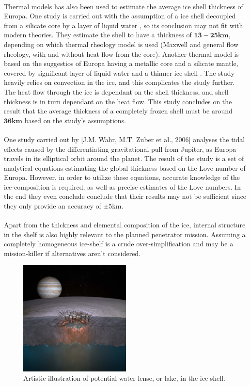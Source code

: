 \\
Thermal models has also been used to estimate the average ice shell thickness of Europa. One study is carried out with the assumption of a ice shell decoupled from a silicate core by a layer of liquid water \cite{ThermThick}, so its conclusion may not fit with modern theories. They estimate the shell to have a thickness of $\mathbf{13-25km}$, depending on which thermal rheology model is used (Maxwell and general flow rheology, with and without heat flow from the core). Another thermal model is based on the suggestios of Europa having a metallic core and a silicate mantle, covered by significant layer of liquid water and a thinner ice shell \cite{ThermThick2}. The study heavily relies on convection in the ice, and this complicates the study further. The heat flow through the ice is dependant on the shell thickness, and shell thickness is in turn dependant on the heat flow. This study concludes on the result that the average thickness of a completely frozen shell must be around $\mathbf{36km}$ based on the study's assumptions.
\\
\\ One study carried out by [J.M. Wahr, M.T. Zuber et al., 2006] analyses the tidal effects caused by the differentiating gravitational pull from Jupiter, as Europa travels in its elliptical orbit around the planet. The result of the study is a set of analytical equations estimating the global thickness based on the Love-number of Europa. However, in order to utilize these equations, accurate knowledge of the ice-composition is required, as well as precise estimates of the Love numbers. In the end they even conclude conclude that their results may not be sufficient since they only provide an accuracy of $\pm 5\mathrm{km}$.\\
\\
Apart from the thickness and elemental composition of the ice, internal structure in the shelf is also highly relevant to the planned penetrator mission. Assuming a completely homogeneous ice-shelf is a crude over-simplification and may be a mission-killer if alternatives aren't considered. 
\begin{figure}[htb]
	\centering
	\includegraphics[width=0.5\textwidth]{figures/Rasmus/ArtLake}
	\caption{Artistic illustration of potential water lense, or lake, in the ice shell. \label{fig: ArtLake}}
\end{figure}
